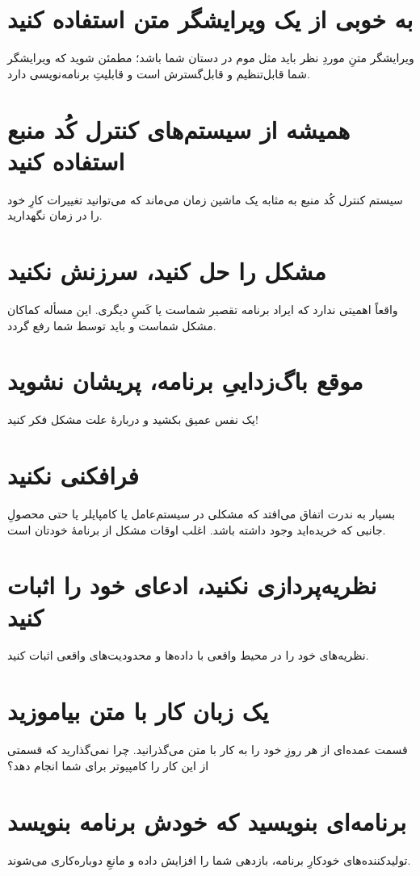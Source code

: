 \documentclass[10pt, a4paper]{book}
\begin{document}
    \section{به خوبی از یک ویرایشگر متن استفاده کنید}
    ویرایشگر متنِ موردِ نظر باید مثل موم در دستان شما باشد؛ مطمئن شوید که ویرایشگر شما قابل‌تنظیم و قابل‌گسترش است و قابلیتِ برنامه‌نویسی دارد.

    \section{همیشه از سیستم‌های کنترل کُد منبع استفاده کنید}
    سیستم کنترل کُد منبع به مثابه یک ماشین زمان می‌ماند که می‌توانید تغییرات کارِ خود را در زمان نگهدارید.

    \section{مشکل را حل کنید، سرزنش نکنید}
    واقعاً اهمیتی ندارد که ایراد برنامه تقصیر شماست یا کَسِ دیگری. این مسأله کماکان مشکل شماست و باید توسط شما رفع گردد.

    \section{موقع باگ‌زداییِ برنامه، پریشان نشوید}
    یک نفس عمیق بکشید و دربارهٔ علت مشکل فکر کنید!

    \section{فرافکنی نکنید}
    بسیار به ندرت اتفاق می‌افتد که مشکلی در سیستم‌عامل یا کامپایلر یا حتی محصولِ جانبی که خریده‌اید وجود داشته باشد. اغلب اوقات مشکل از برنامهٔ خودتان است.

    \section{نظریه‌پردازی نکنید، ادعای خود را اثبات کنید}
    نظریه‌های خود را در محیط واقعی با داده‌ها و محدودیت‌های واقعی اثبات کنید.

    \section{یک زبان کار با متن بیاموزید}
    قسمت عمده‌ای از هر روزِ خود را به کار با متن می‌گذرانید. چرا نمی‌گذارید که قسمتی از این کار را کامپیوتر برای شما انجام دهد؟

    \section{برنامه‌ای بنویسید که خودش برنامه بنویسد}
    تولیدکننده‌های خودکارِ برنامه، بازدهی شما را افزایش داده و مانعِ دوباره‌کاری می‌شوند.
\end{document}
